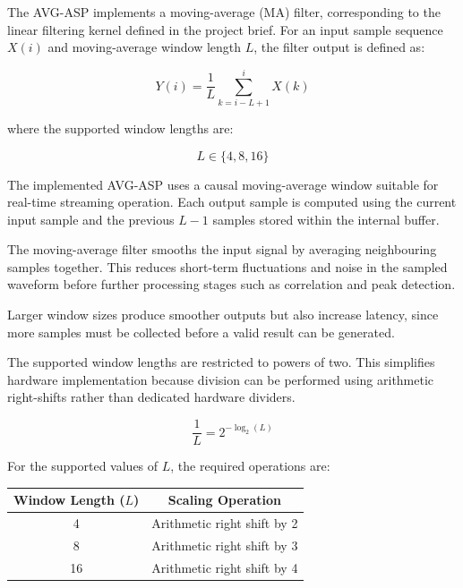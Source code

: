 \documentclass[10pt, a4paper]{article}
\begin{document}
The AVG-ASP implements a moving-average (MA) filter, corresponding to the linear filtering kernel defined in the project brief. For an input sample sequence $X(i)$ and moving-average window length $L$, the filter output is defined as:

\begin{equation}
    Y(i)=\frac{1}{L}\sum_{k=i-L+1}^{i}X(k) 
    \label{eq:moving_average}
\end{equation}

where the supported window lengths are:

\begin{equation}
    L \in \{4, 8, 16\}
\end{equation}

The implemented AVG-ASP uses a causal moving-average window suitable for real-time streaming operation. Each output sample is computed using the current input sample and the previous $L-1$ samples stored within the internal buffer.

The moving-average filter smooths the input signal by averaging neighbouring samples together. This reduces short-term fluctuations and noise in the sampled waveform before further processing stages such as correlation and peak detection.

Larger window sizes produce smoother outputs but also increase latency, since more samples must be collected before a valid result can be generated.

The supported window lengths are restricted to powers of two. This simplifies hardware implementation because division can be performed using arithmetic right-shifts rather than dedicated hardware dividers.

\begin{equation}
    \frac{1}{L} = 2^{-\log_2(L)}
\end{equation}

For the supported values of $L$, the required operations are:

\begin{center}
\begin{tabular}{|c|c|}
    \hline
    \textbf{Window Length ($L$)} & \textbf{Scaling Operation} \\
    \hline
    4                   & Arithmetic right shift by 2 \\ \hline
    8                   & Arithmetic right shift by 3 \\ \hline
    16                  & Arithmetic right shift by 4 \\
    \hline
\end{tabular}
\end{center}
\end{document}
